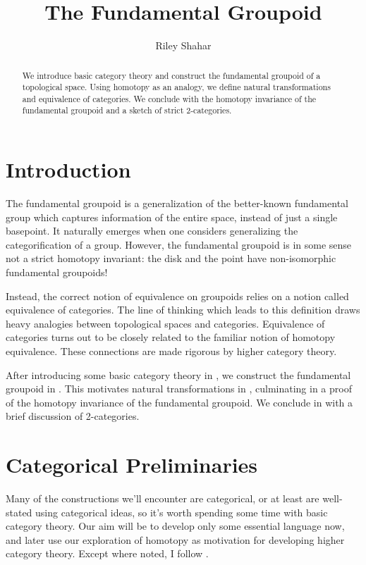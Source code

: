 \documentclass[11 pt]{amsart}
\title{The Fundamental Groupoid}
\author{Riley Shahar}
\theoremstyle{plain}   %
\theoremstyle{definition}
\theoremstyle{remark}
\numberwithin{equation}{section}
\begin{document}
\begin{abstract}
	We introduce basic category theory and construct the fundamental groupoid of a
	topological space. Using homotopy as an analogy, we define natural
	transformations and equivalence of categories. We conclude with the
	homotopy invariance of the fundamental groupoid and a sketch of strict
	2-categories.
\end{abstract}


\maketitle

\section{Introduction}

The fundamental groupoid is a generalization of the better-known fundamental
group which captures information of the entire space, instead of just a single
basepoint. It naturally emerges when one considers generalizing the
categorification of a group. However, the fundamental groupoid is in some sense
not a strict homotopy invariant: the disk and the point have non-isomorphic
fundamental groupoids!

Instead, the correct notion of equivalence on groupoids relies on a notion
called equivalence of categories. The line of thinking which leads to this
definition draws heavy analogies between topological spaces and categories.
Equivalence of categories turns out to be closely related to the familiar notion
of homotopy equivalence. These connections are made rigorous by higher category
theory.

After introducing some basic category theory in , we construct
the fundamental groupoid in . This motivates
natural transformations in , culminating in a
proof of the homotopy invariance of the fundamental groupoid. We conclude in
 with a brief discussion of 2-categories.

\section{Categorical Preliminaries}\label{categories}

Many of the constructions we'll encounter are categorical, or at least are
well-stated using categorical ideas, so it's worth spending some time with basic
category theory. Our aim will be to develop only some essential language now,
and later use our exploration of homotopy as motivation for developing higher
category theory. Except where noted, I follow \cite[Sections 1.1-1.3]{Riehl}.
\end{document}

